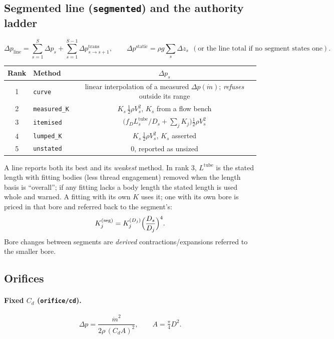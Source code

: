\documentclass[11pt,a4paper]{article}
\newcommand{\mdot}{\dot{m}}
\newcommand{\code}[1]{\texttt{#1}}
\begin{document}
\subsection{Segmented line (\code{segmented}) and the authority ladder}\label{sec:segments}
\begin{equation}
  \Delta p_{\mathrm{line}} = \sum_{s=1}^{S}\Delta p_s + \sum_{s=1}^{S-1}\Delta p^{\mathrm{trans}}_{s\to s+1},
  \qquad
  \Delta p^{\mathrm{static}} = \rho g\sum_s\Delta z_s\ \ (\text{or the line total if no segment states one}).
\end{equation}
\begin{center}
\begin{tabular}{clc}
\toprule
Rank & Method & $\Delta p_s$ \\
\midrule
1 & \code{curve}       & linear interpolation of a measured $\Delta p(\mdot)$; \emph{refuses} outside its range \\
2 & \code{measured\_K} & $K_s\,\tfrac12\rho V_s^2$, $K_s$ from a flow bench \\
3 & \code{itemised}    & $\bigl(f_D L_s^{\mathrm{tube}}/D_s+\sum_j K_j\bigr)\tfrac12\rho V_s^2$ \\
4 & \code{lumped\_K}   & $K_s\,\tfrac12\rho V_s^2$, $K_s$ asserted \\
5 & \code{unstated}    & $0$, reported as unsized \\
\bottomrule
\end{tabular}
\end{center}
A line reports both its best and its \emph{weakest} method. In rank 3,
$L^{\mathrm{tube}}$ is the stated length with fitting bodies (less thread
engagement) removed when the length basis is ``overall''; if any fitting lacks
a body length the stated length is used whole and warned. A fitting with its
own $K$ uses it; one with its own bore is priced in that bore and referred back
to the segment's:
\begin{equation}
  K_j^{\mathrm{(seg)}} = K_j^{(D_j)}\Bigl(\frac{D_s}{D_j}\Bigr)^{4}.
\end{equation}
Bore changes between segments are \emph{derived} contractions/expansions
referred to the smaller bore.

\subsection{Orifices}
\paragraph{Fixed $C_d$ (\code{orifice/cd}).}
\begin{equation}
  \Delta p = \frac{\mdot^2}{2\rho\,(C_dA)^2},\qquad A=\tfrac{\pi}{4}D^2 .
  \label{eq:orifice}
\end{equation}
\end{document}
